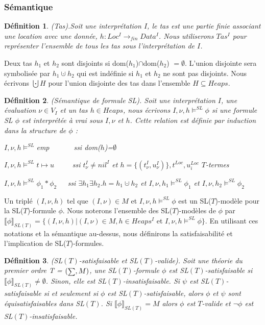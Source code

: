 \documentclass[11pt,openany]{article}
\newcommand\phibra{\llbracket\phi\rrbracket}
\newcommand\smallsum{\mathsmaller\sum}
\newtheorem{definition}{D\'efinition}[subsection]
\begin{document}
		\subsubsection{S\'emantique}
	\begin{definition}
	(Tas).Soit une interpr\'etation $I$, le tas est une partie finie associant une location avec une donn\'ee, $h : Loc^{I} \rightarrow_{fin} Data^{I}$. Nous utiliserons $Tas^{I}$ pour repr\'esenter l'ensemble de tous les tas sous l'interpr\'etation de $I$.
	\end{definition}
	Deux tas $h_{1}$ et $h_{2}$ sont disjoints si dom($h_{1}$)$\cap$dom($h_{2}$) $= \emptyset$. L'union disjointe sera symbolis\'ee par $h_{1}\cupdot h_{2}$ qui est ind\'efinie si $h_{1}$ et $h_{2}$ ne sont pas disjoints. Nous \'ecrivons $\bigcupdot H$ pour l'union disjointe des tas dans l'ensemble $H \subseteq Heaps$.
	\begin{definition}
	(S\'emantique de formule SL). Soit une interpr\'etation $I$, une \'evaluation $\nu\in V_{I}$ et un tas $h\in Heaps$, nous \'ecrivons $I,\nu,h\models^{SL}\phi$ si une formule SL $\phi$ est interpr\'et\'ee \`a vrai sous $I,\nu$ et $h$. Cette relation est d\'efinie par induction  dans la structure de $\phi$ :
	
$I,\nu,h\models^{SL}$emp ~~~~~~ssi dom($h$)=$\emptyset$

$I,\nu,h\models^{SL}t\mapsto u$~~~~~ssi $t^{I}_{\nu}\neq nil^{I}$ et $h = \{(t^{I}_{\nu},u^{I}_{\nu} )\}, t^{Loc}, u^{Loc}_{i}$ $T$-termes

$I,\nu,h\models^{SL}\phi_{1}*\phi_{2}$~~~ssi $\exists h_{1}\exists h_{2}.h=h_{1}\cupdot h_{2}$ et $I,\nu,h_{1}\models^{SL}\phi_{1}$ et $I,\nu,h_{2}\models^{SL}\phi_{2}$

	\end{definition}
	Un tripl\'e $(I,\nu,h)$ tel que $(I,\nu)\in M$ et $I,\nu,h\models^{SL}\phi$ est un SL($T$)-mod\`ele pour la SL($T$)-formule $\phi$. Nous noterons l'ensemble des SL($T$)-mod\`eles de $\phi$ par $\phibra_{SL(T)} = \{(I,\nu,h)|(I,\nu)\in M,h\in Heaps^{I}$ et $I,\nu,h\models^{SL}\phi\}$. En utilisant ces notations et la s\'emantique au-dessus, nous d\'efinirons la satisfaisabilit\'e et l'implication de SL($T$)-formules.
\begin{definition}
(SL$(T)$-satisfaisable et SL$(T)$-valide). Soit une th\'eorie du premier ordre T = $(\smallsum,M)$, une SL$(T)$-formule $\phi$ est SL$(T)$-satisfaisable si $\phibra_{SL(T)}\neq\emptyset$. Sinon, elle est SL$(T)$-insatisfaisable. Si $\psi$ est SL$(T)$-satisfaisable si et seulement si $\phi$ est SL$(T)$-satisfaisable, alors $\phi$ et $\psi$ sont \textit{\'equisatisfaisables} dans SL$(T)$. Si $\phibra_{SL(T)}=M$ alors $\phi$ est $T$-valide et $\neg\phi$ est SL$(T)$-insatisfaisable.
\end{definition}
\end{document}
